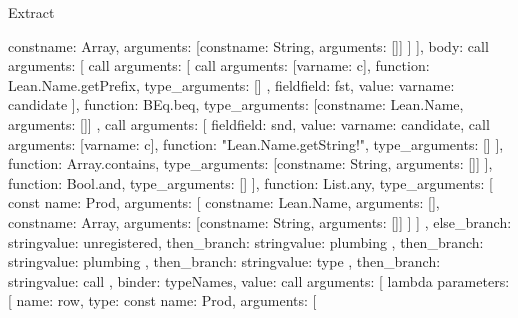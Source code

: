 \begin{lexlean}{Extract}
\begin{toolingmodule}
{{{{{{{{{{{                              const{name: Array, arguments: [const{name: String, arguments: []}]}
                            ]
                          }
                        }
                      ],
                      body: call{
                        arguments: [
                          call{
                            arguments: [
                              call{
                                arguments: [var{name: c}],
                                function: Lean.Name.getPrefix,
                                type_arguments: []
                              },
                              field{field: fst, value: var{name: candidate}}
                            ],
                            function: BEq.beq,
                            type_arguments: [const{name: Lean.Name, arguments: []}]
                          },
                          call{
                            arguments: [
                              field{field: snd, value: var{name: candidate}},
                              call{
                                arguments: [var{name: c}],
                                function: "Lean.Name.getString!",
                                type_arguments: []
                              }
                            ],
                            function: Array.contains,
                            type_arguments: [const{name: String, arguments: []}]
                          }
                        ],
                        function: Bool.and,
                        type_arguments: []
                      }
                    }
                  ],
                  function: List.any,
                  type_arguments: [
                    const{
                      name: Prod,
                      arguments: [
                        const{name: Lean.Name, arguments: []},
                        const{name: Array, arguments: [const{name: String, arguments: []}]}
                      ]
                    }
                  ]
                },
                else_branch: string{value: unregistered},
                then_branch: string{value: plumbing}
              },
              then_branch: string{value: plumbing}
            },
            then_branch: string{value: type}
          },
          then_branch: string{value: call}
        },
        binder: typeNames,
        value: call{
          arguments: [
            lambda{
              parameters: [
                {
                  name: row,
                  type: const{
                    name: Prod,
                    arguments: [
}}}}}}}
\end{toolingmodule}
\end{lexlean}
